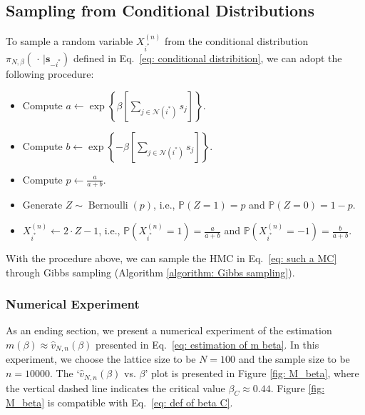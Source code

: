 \documentclass[11pt,letterpaper, leqno]{article}
\numberwithin{equation}{section}
\numberwithin{theorem}{section}
\numberwithin{lemma}{section}
\numberwithin{corollary}{section}
\numberwithin{definition}{section}
\numberwithin{proposition}{section}
\numberwithin{remark}{section}
\numberwithin{example}{section}
\begin{document}
\subsection{Sampling from Conditional Distributions}

To sample a random variable $X_{i^*}^{(n)}$ from the conditional distribution $\pi_{N,\beta}(\,\cdot\, \vert\boldsymbol{s}_{-i^*})$ defined in Eq.~\eqref{eq: conditional distribition}, we can adopt the following procedure:
\begin{itemize}
    \item Compute $a \leftarrow \exp\left\{\beta\left[\sum_{j\in\mathcal{N}(i^*)} s_j\right]\right\}$.
    
    \item Compute $b \leftarrow \exp\left\{-\beta\left[\sum_{j\in\mathcal{N}(i^*)} s_j\right]\right\}$.
    
    \item Compute $p\leftarrow \frac{a}{a+b}$.

    \item Generate $Z\sim \operatorname{Bernoulli}(p)$, i.e., $\mathbb{P}(Z=1)=p$ and $\mathbb{P}(Z=0)=1-p$.

    \item $X_{i^*}^{(n)} \leftarrow 2\cdot Z-1$, i.e., $\mathbb{P}(X_{i^*}^{(n)}=1) = \frac{a}{a+b}$ and $\mathbb{P}(X_{i^*}^{(n)}=-1) = \frac{b}{a+b}$.
\end{itemize}
With the procedure above, we can sample the HMC in Eq.~\eqref{eq: such a MC} through Gibbs sampling (Algorithm \ref{algorithm: Gibbs sampling}).

\subsubsection{Numerical Experiment}

As an ending section, we present a numerical experiment of the estimation $m(\beta) \approx \widehat{v}_{N,n}(\beta)$ presented in Eq.~\eqref{eq: estimation of m beta}. In this experiment, we choose the lattice size to be $N=100$ and the sample size to be $n=10000$. The `$\widehat{v}_{N,n}(\beta)$ vs. $\beta$' plot is presented in Figure \ref{fig: M_beta}, where the vertical dashed line indicates the critical value $\beta_C\approx 0.44$. Figure \ref{fig: M_beta} is compatible with Eq.~\eqref{eq: def of beta C}.
\end{document}
